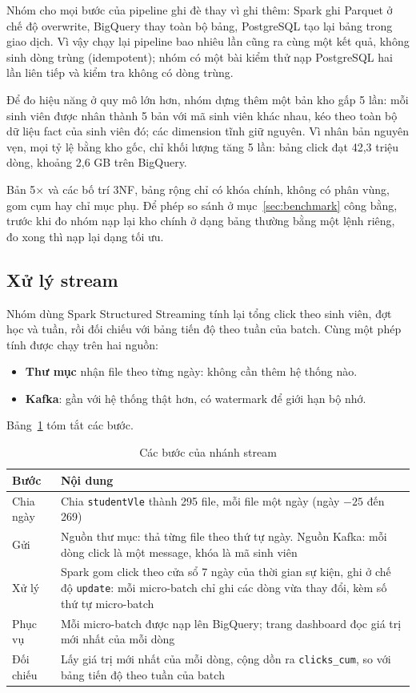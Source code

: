 Nhóm cho mọi bước của pipeline ghi đè thay vì ghi thêm: Spark ghi Parquet ở chế độ overwrite, BigQuery thay toàn bộ bảng, PostgreSQL tạo lại bảng trong giao dịch. Vì vậy chạy lại pipeline bao nhiêu lần cũng ra cùng một kết quả, không sinh dòng trùng (idempotent); nhóm có một bài kiểm thử nạp PostgreSQL hai lần liên tiếp và kiểm tra không có dòng trùng.

Để đo hiệu năng ở quy mô lớn hơn, nhóm dựng thêm một bản kho gấp 5 lần: mỗi sinh viên được nhân thành 5 bản với mã sinh viên khác nhau, kéo theo toàn bộ dữ liệu fact của sinh viên đó; các dimension tĩnh giữ nguyên. Vì nhân bản nguyên vẹn, mọi tỷ lệ bằng kho gốc, chỉ khối lượng tăng 5 lần: bảng click đạt 42,3 triệu dòng, khoảng 2,6 GB trên BigQuery.

Bản 5$\times$ và các bố trí 3NF, bảng rộng chỉ có khóa chính, không có phân vùng, gom cụm hay chỉ mục phụ. Để phép so sánh ở mục~\ref{sec:benchmark} công bằng, trước khi đo nhóm nạp lại kho chính ở dạng bảng thường bằng một lệnh riêng, đo xong thì nạp lại dạng tối ưu.

\subsection{Xử lý stream}
\label{sec:stream}

Nhóm dùng Spark Structured Streaming tính lại tổng click theo sinh viên, đợt học và tuần, rồi đối chiếu với bảng tiến độ theo tuần của batch. Cùng một phép tính được chạy trên hai nguồn:
\begin{itemize}
  \item \textbf{Thư mục} nhận file theo từng ngày: không cần thêm hệ thống nào.
  \item \textbf{Kafka}: gần với hệ thống thật hơn, có watermark để giới hạn bộ nhớ.
\end{itemize}
Bảng~\ref{tab:stream-buoc} tóm tắt các bước.

\begin{table}[htbp]
\centering
\small
\begin{tabularx}{\textwidth}{|p{2.2cm}|X|}
\hline
\textbf{Bước} & \textbf{Nội dung} \\ \hline
Chia ngày & Chia \texttt{studentVle} thành 295 file, mỗi file một ngày (ngày $-25$ đến 269) \\ \hline
Gửi & Nguồn thư mục: thả từng file theo thứ tự ngày. Nguồn Kafka: mỗi dòng click là một message, khóa là mã sinh viên \\ \hline
Xử lý & Spark gom click theo cửa sổ 7 ngày của thời gian sự kiện, ghi ở chế độ \texttt{update}: mỗi micro-batch chỉ ghi các dòng vừa thay đổi, kèm số thứ tự micro-batch \\ \hline
Phục vụ & Mỗi micro-batch được nạp lên BigQuery; trang dashboard đọc giá trị mới nhất của mỗi dòng \\ \hline
Đối chiếu & Lấy giá trị mới nhất của mỗi dòng, cộng dồn ra \texttt{clicks\_cum}, so với bảng tiến độ theo tuần của batch \\ \hline
\end{tabularx}
\caption{Các bước của nhánh stream}
\label{tab:stream-buoc}
\end{table}

